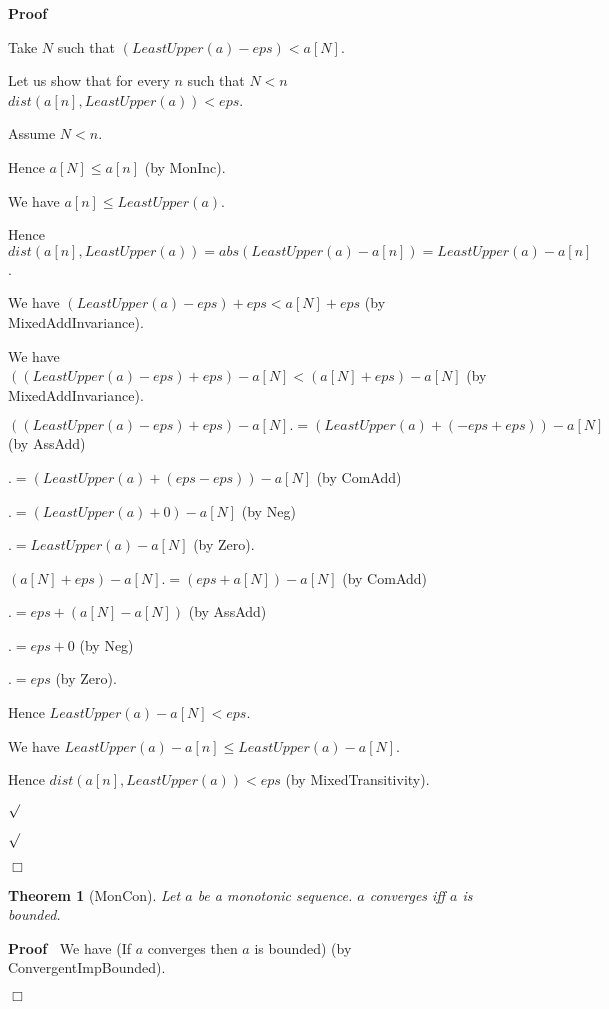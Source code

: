 \documentclass{article}
\newenvironment{forthel}{\begin{leftbar}}{\end{leftbar}}
\newenvironment{proof}{\noindent\textbf{Proof\ }}{\hspace*{\fill}$\Box$\medskip}
\newenvironment{subproof}{\begin{list}{}{}
		\item[\text{Proof}]}{\hfill $\surd$ \end{list}}
\newtheorem{theorem}{Theorem}
\begin{document}
\begin{forthel}
\begin{proof}
\begin{subproof}
			Take $N$ such that $(LeastUpper(a) - eps) < a[N]$.
			
			Let us show that for every $n$ such that $N < n$ $dist(a[n],LeastUpper(a)) < eps$.
			
			\begin{subproof}
				Assume $N < n$.
				
				Hence $a[N] \leq a[n]$ (by MonInc).
				
				We have $a[n] \leq LeastUpper(a)$.
				
				Hence $dist(a[n],LeastUpper(a)) = abs(LeastUpper(a) - a[n]) = LeastUpper(a) - a[n]$.
				
				We have $(LeastUpper(a) - eps) + eps < a[N] + eps$ (by MixedAddInvariance).
				
				We have $((LeastUpper(a) - eps) + eps) - a[N] < (a[N] + eps) - a[N]$ (by MixedAddInvariance).
				
				$((LeastUpper(a) - eps) + eps) - a[N] .= (LeastUpper(a) + (-eps + eps)) - a[N]$ (by AssAdd)
				
				$.= (LeastUpper(a) + (eps - eps)) - a[N]$ (by ComAdd)
				
				$.= (LeastUpper(a) + 0) - a[N]$ (by Neg)
				
				$.= LeastUpper(a) - a[N]$ (by Zero).
				
				$(a[N] + eps) - a[N] .= (eps + a[N]) - a[N]$ (by ComAdd)
				
				$.= eps + (a[N] - a[N])$ (by AssAdd)
				
				$.= eps + 0$ (by Neg)
				
				$.= eps$ (by Zero).
				
				Hence $LeastUpper(a) - a[N] < eps$.
				
				We have $LeastUpper(a) - a[n] \leq LeastUpper(a) - a[N]$.
				
				Hence $dist(a[n],LeastUpper(a)) < eps$ (by MixedTransitivity).
				
			\end{subproof}
			
		\end{subproof}
	\end{proof}
	
	\begin{theorem}[MonCon]
		Let $a$ be a monotonic sequence. $a$ converges iff $a$ is bounded.
	\end{theorem}
	
	\begin{proof}
		We have (If $a$ converges then $a$ is bounded) (by ConvergentImpBounded).
		

\end{proof}
\end{forthel}
\end{document}
